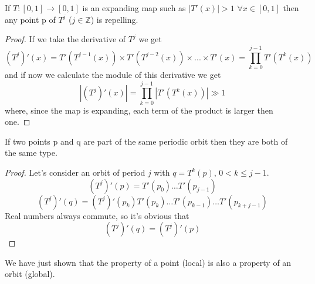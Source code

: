 \begin{prop}
    If $T : \left[0,1\right] \to \left[0,1\right]$ is an expanding map such as $\left\lvert T'\left(x\right)\right\rvert > 1$ $\forall x \in \left[0,1\right]$ then any point p of $T^j$ ($j \in \mathbb{Z}$) is repelling.
\end{prop}
\begin{proof}
	If we take the derivative of $T^j$ we get
	$$
		(T^j)'(x) = T'(T^{j-1}(x))\times T'(T^{j-2}(x))\times...\times T'(x) = \prod_{k=0}^{j-1}T'\left(T^k\left(x\right)\right)
   $$
  	and if now we calculate the module of this derivative we get 
   $$
       \left\lvert\left(T^j\right)'\left(x\right)\right\rvert = \prod_{k=0}^{j-1}\left\lvert T'\left(T^k\left(x\right)\right)\right\rvert \gg 1
   $$
	where, since the map is expanding, each term of the product is larger then one.
\end{proof}
\begin{prop}
    If two points p and q are part of the same periodic orbit then they are both of the same type.
\end{prop}
\begin{proof}
    Let's consider an orbit of period $j$ with $q=T^k\left(p\right)$, $0 < k \leq j-1$.
    $$
        \left(T^j\right)'\left(p\right) = T'\left(p_0\right)\ldots T'\left(p_{j-1}\right)
    $$
    $$
        \left(T^j\right)'\left(q\right) = \left(T^j\right)'\left(p_k\right) T'\left(p_k\right)\ldots T'\left(p_{k-1}\right) \ldots T'\left(p_{k+j-1}\right)
    $$
    Real numbers always commute, so it's obvious that
    $$
        \left(T^j\right)'\left(q\right) = \left(T^j\right)'\left(p\right)
    $$
\end{proof}
We have just shown that the property of a point (local) is also a property of an orbit (global).
